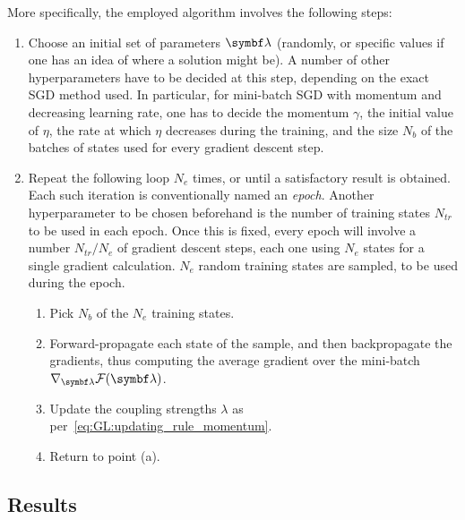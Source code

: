 More specifically, the employed algorithm involves the following steps:
\begin{enumerate}
	\item Choose an initial set of parameters $\bs\lambda$ (randomly, or specific values if one has an idea of where a solution might be).
	A number of other hyperparameters have to be decided at this step, depending on the exact \ac{SGD} method used. In particular, for mini-batch \ac{SGD} with momentum and decreasing learning rate, one has to decide the momentum $\gamma$, the initial value of $\eta$, the rate at which $\eta$ decreases during the training, and the size $N_b$ of the batches of states used for every gradient descent step.
	\item Repeat the following loop $N_e$ times, or until a satisfactory result is obtained.
	Each such iteration is conventionally named an \emph{epoch}.
	Another hyperparameter to be chosen beforehand is the number of training states $N_{tr}$ to be used in each epoch.
	Once this is fixed, every epoch will involve a number $N_{tr}/N_e$ of gradient descent steps, each one using $N_e$ states for a single gradient calculation.
	$N_e$ random training states are sampled, to be used during the epoch.
	\begin{enumerate}
		\item Pick $N_b$ of the $N_e$ training states.
		\item Forward-propagate each state of the sample, and then backpropagate the gradients, thus computing the average gradient over the mini-batch $\grad_{\bs\lambda} \calF(\bs\lambda)$.
		\item Update the coupling strengths $\lambda$ as per~\cref{eq:GL:updating_rule_momentum}.
		\item Return to point (a).
	\end{enumerate}
\end{enumerate}

\subsection{Results}
\label{subsec:GL:numerical_results}

